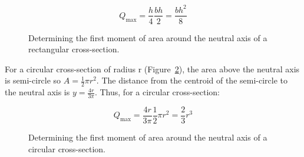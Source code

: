 \documentclass[
  letterpaper,
  DIV=11,
  numbers=noendperiod]{scrreprt}
\theoremstyle{definition}
\theoremstyle{remark}
\begin{document}
\[
Q_{\max }=\frac{h}{4} \frac{b h}{2}=\frac{b h^2}{8}
\]

\begin{figure}


\caption{\label{fig-10.2}Determining the first moment of area around the
neutral axis of a rectangular cross-section.}

\end{figure}%

For a circular cross-section of radius r (Figure~\ref{fig-10.3}), the
area above the neutral axis is semi-circle so \(A=\frac{1}{2} \pi r^2\).
The distance from the centroid of the semi-circle to the neutral axis is
\(y=\frac{4 r}{3 \pi}\). Thus, for a circular cross-section:

\[
Q_{\max }=\frac{4 r}{3 \pi} \frac{1}{2} \pi r^2=\frac{2}{3} r^3
\]

\begin{figure}


\caption{\label{fig-10.3}Determining the first moment of area around the
neutral axis of a circular cross-section.}

\end{figure}%
\end{document}
